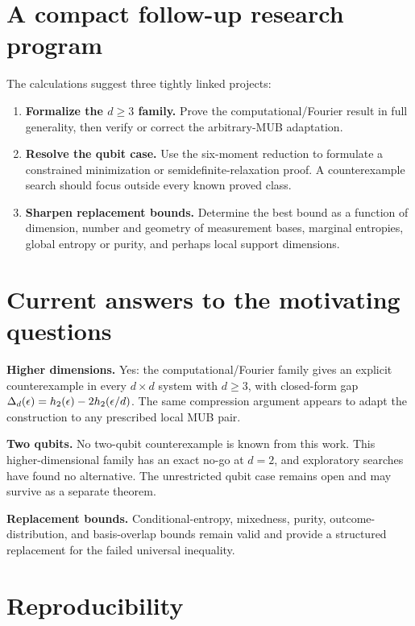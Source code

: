 \section{A compact follow-up research program}

The calculations suggest three tightly linked projects:
\begin{enumerate}
\item \textbf{Formalize the $d\ge3$ family.} Prove the computational/Fourier result in full generality, then verify or correct the arbitrary-MUB adaptation.
\item \textbf{Resolve the qubit case.} Use the six-moment reduction to formulate a constrained minimization or semidefinite-relaxation proof. A counterexample search should focus outside every known proved class.
\item \textbf{Sharpen replacement bounds.} Determine the best bound as a function of dimension, number and geometry of measurement bases, marginal entropies, global entropy or purity, and perhaps local support dimensions.
\end{enumerate}

\section{Current answers to the motivating questions}

\begin{tcolorbox}[colback=cqcpale,colframe=cqcblue!60!black,boxrule=0.55pt,arc=1.5pt,left=6pt,right=6pt,top=5pt,bottom=5pt]
\textbf{Higher dimensions.} Yes: the computational/Fourier family gives an explicit counterexample in every $d\times d$ system with $d\ge3$, with closed-form gap $\Delta_d(\epsilon)=h_2(\epsilon)-2h_2(\epsilon/d)$. The same compression argument appears to adapt the construction to any prescribed local MUB pair.

\textbf{Two qubits.} No two-qubit counterexample is known from this work. This higher-dimensional family has an exact no-go at $d=2$, and exploratory searches have found no alternative. The unrestricted qubit case remains open and may survive as a separate theorem.

\textbf{Replacement bounds.} Conditional-entropy, mixedness, purity, outcome-distribution, and basis-overlap bounds remain valid and provide a structured replacement for the failed universal inequality.
\end{tcolorbox}

\section*{Reproducibility}

